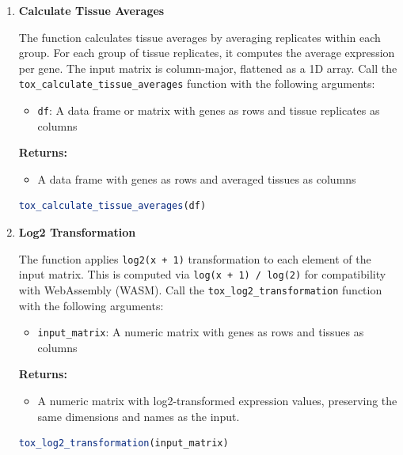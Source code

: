 \begin{enumerate}
\begin{enumerate}
            \item \textbf{Calculate Tissue Averages}
                  
                  The function calculates tissue averages by averaging replicates within
                  each group. For each group of tissue replicates, it computes the average
                  expression per gene. The input matrix is column-major, flattened as a 1D
                  array. Call the \texttt{tox\_calculate\_tissue\_averages} function with
                  the following arguments:
                  
                  \begin{itemize}
                    \item \texttt{df}: A data frame or matrix with genes as rows and tissue
                          replicates as columns
                  \end{itemize}
                  
                  \textbf{Returns:}
                  \begin{itemize}
                    \item A data frame with genes as rows and averaged tissues as columns
                  \end{itemize}
                  \begin{lstlisting}[language=R, caption={R Tissue Averages Calculation}]
tox_calculate_tissue_averages(df)
                  \end{lstlisting}
                  
            \item \textbf{Log2 Transformation}
                  
                  The function applies \texttt{log2(x + 1)} transformation to each
                  element of the input matrix. This is computed via \texttt{log(x + 1) /
                    log(2)} for compatibility with WebAssembly (WASM). Call the \texttt{tox\_log2\_transformation}
                  function with the following arguments:
                  
                  \begin{itemize}
                    \item \texttt{input\_matrix}: A numeric matrix with genes as rows and
                          tissues as columns
                  \end{itemize}
                  
                  \textbf{Returns:}
                  \begin{itemize}
                    \item A numeric matrix with log2-transformed expression values,
                          preserving the same dimensions and names as the input.
                  \end{itemize}
                  \begin{lstlisting}[language=R, caption={R Log2 Transformation}]
tox_log2_transformation(input_matrix)
                  \end{lstlisting}
          \end{enumerate}
          

\end{enumerate}
